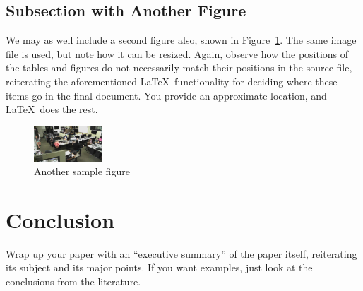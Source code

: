\documentclass{article}
\begin{document}
\subsection{Subsection with Another Figure}

We may as well include a second figure also, shown in Figure~\ref{figure-sample2}.  The same image file is used, but note how it can be resized.  Again, observe how the positions of the tables and figures do not necessarily match their positions in the source file, reiterating the aforementioned \LaTeX\ functionality for deciding where these items go in the final document.  You provide an approximate location, and \LaTeX\ does the rest.

\begin{figure}
\centering
\includegraphics[width=1in]{space.jpg} 

\caption{Another sample figure}
\label{figure-sample2}
\end{figure}

\section{Conclusion}

Wrap up your paper with an ``executive summary'' of the paper itself, reiterating its subject and its major points.  If you want examples, just look at the conclusions from the literature.



\end{document}
